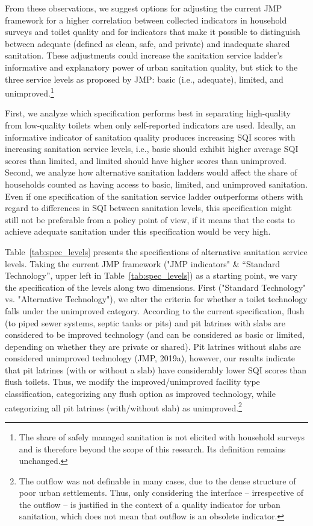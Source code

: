 \documentclass[natbib]{svjour3}                     %
\begin{document}
From these observations, we suggest options for adjusting the current JMP framework for a higher correlation between collected indicators in household surveys and toilet quality and for indicators that make it possible to distinguish between adequate (defined as clean, safe, and private) and inadequate shared sanitation. These adjustments could increase the sanitation service ladder’s informative and explanatory power of urban sanitation quality, but stick to the three service levels as proposed by JMP: basic (i.e., adequate), limited, and unimproved.\footnote{The share of safely managed sanitation is not elicited with household surveys and is therefore beyond the scope of this research. Its definition remains unchanged.}

First, we analyze which specification performs best in separating high-quality from low-quality toilets when only self-reported indicators are used. Ideally, an informative indicator of sanitation quality produces increasing SQI scores with increasing sanitation service levels, i.e., basic should exhibit higher average SQI scores than limited, and limited should have higher scores than unimproved. Second, we analyze how alternative sanitation ladders would affect the share of households counted as having access to basic, limited, and unimproved sanitation. Even if one specification of the sanitation service ladder outperforms others with regard to differences in SQI between sanitation levels, this specification might still not be preferable from a policy point of view, if it means that the costs to achieve adequate sanitation under this specification would be very high.

Table~\ref{tab:spec_levels} presents the specifications of alternative sanitation service levels. Taking the current JMP framework ("JMP indicators" \& “Standard Technology”, upper left in Table~\ref{tab:spec_levels}) as a starting point, we vary the specification of the levels along two dimensions. First ("Standard Technology" vs. "Alternative Technology"), we alter the criteria for whether a toilet technology falls under the unimproved category. According to the current specification, flush (to piped sewer systems, septic tanks or pits) and pit latrines with slabs are considered to be improved technology (and can be considered as basic or limited, depending on whether they are private or shared). Pit latrines without slabs are considered unimproved technology (JMP, 2019a), however, our results indicate that pit latrines (with or without a slab) have considerably lower SQI scores than flush toilets. Thus, we modify the improved/unimproved facility type classification, categorizing any flush option as improved technology, while categorizing all pit latrines (with/without slab) as unimproved.\footnote{The outflow was not definable in many cases, due to the dense structure of poor urban settlements. Thus, only considering the interface -- irrespective of the outflow -- is justified in the context of a quality indicator for urban sanitation, which does not mean that outflow is an obsolete indicator.} 
\end{document}
